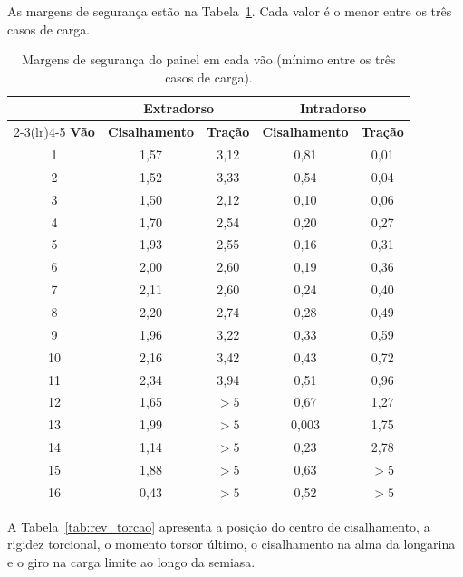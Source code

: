 As margens de segurança estão na Tabela~\ref{tab:rev_ms}. Cada valor é o menor entre os três casos de carga.
 
\begin{table}[H]
\centering
\caption{Margens de segurança do painel em cada vão (mínimo entre os três casos de carga).}
\label{tab:rev_ms}
\small
\setlength{\tabcolsep}{4pt}
\begin{tabular}{ccccc}
\toprule
 & \multicolumn{2}{c}{\textbf{Extradorso}} & \multicolumn{2}{c}{\textbf{Intradorso}} \\
\cmidrule(lr){2-3}\cmidrule(lr){4-5}
\textbf{Vão} & \textbf{Cisalhamento} & \textbf{Tração} & \textbf{Cisalhamento} & \textbf{Tração} \\
\midrule
1 & 1{,}57 & 3{,}12 & 0{,}81 & 0{,}01 \\
2 & 1{,}52 & 3{,}33 & 0{,}54 & 0{,}04 \\
3 & 1{,}50 & 2{,}12 & 0{,}10 & 0{,}06 \\
4 & 1{,}70 & 2{,}54 & 0{,}20 & 0{,}27 \\
5 & 1{,}93 & 2{,}55 & 0{,}16 & 0{,}31 \\
6 & 2{,}00 & 2{,}60 & 0{,}19 & 0{,}36 \\
7 & 2{,}11 & 2{,}60 & 0{,}24 & 0{,}40 \\
8 & 2{,}20 & 2{,}74 & 0{,}28 & 0{,}49 \\
9 & 1{,}96 & 3{,}22 & 0{,}33 & 0{,}59 \\
10 & 2{,}16 & 3{,}42 & 0{,}43 & 0{,}72 \\
11 & 2{,}34 & 3{,}94 & 0{,}51 & 0{,}96 \\
12 & 1{,}65 & $>5$ & 0{,}67 & 1{,}27 \\
13 & 1{,}99 & $>5$ & 0{,}003 & 1{,}75 \\
14 & 1{,}14 & $>5$ & 0{,}23 & 2{,}78 \\
15 & 1{,}88 & $>5$ & 0{,}63 & $>5$ \\
16 & 0{,}43 & $>5$ & 0{,}52 & $>5$ \\
\bottomrule
\end{tabular}
\end{table}
 
A Tabela~\ref{tab:rev_torcao} apresenta a posição do centro de cisalhamento, a rigidez torcional, o momento torsor último, o cisalhamento na alma da longarina e o giro na carga limite ao longo da semiasa.
 
